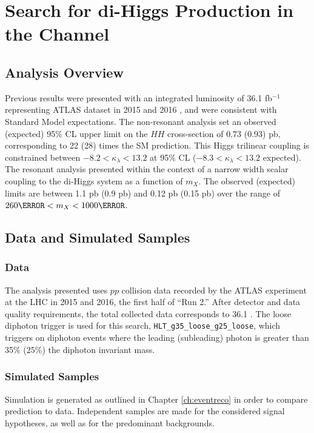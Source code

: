 \chapter{Search for di-Higgs Production in the Channel} %

\section{Analysis Overview}

Previous results were presented with an integrated luminosity of 36.1 fb$^{-1}$ representing ATLAS dataset in 2015 and 2016 \cite{HIGG-2016-15}, and were consistent with Standard Model expectations. The non-resonant analysis set an observed (expected) 95\% CL upper limit on the $HH$ cross-section of 0.73 (0.93) pb, corresponding to 22 (28) times the SM prediction. This Higgs trilinear coupling is constrained between $-8.2 < \kappa_\lambda < 13.2$ at 95\% CL ($-8.3 < \kappa_\lambda < 13.2$ expected). The resonant analysis presented within the context of a narrow width scalar coupling to the di-Higgs system as a function of $m_X$. The observed (expected) limits are between 1.1 pb (0.9 pb) and 0.12 pb (0.15 pb) over the range of $\unit{260}{\GeV} < m_X < \unit{1000}{\GeV}$.

\section{Data and Simulated Samples}


\subsection{Data}

The analysis presented uses $pp$ collision data recorded by the ATLAS experiment at the LHC in 2015 and 2016, the first half of ``Run 2.'' After detector and data quality requirements, the total collected data corresponds to 36.1 \ifb. The loose diphoton trigger is used for this search, \texttt{HLT\_g35\_loose\_g25\_loose}, which triggers on diphoton events where the leading (subleading) photon \pt is greater than 35\% (25\%) the diphoton invariant mass.

\subsection{Simulated Samples}

Simulation is generated as outlined in Chapter \ref{ch:eventreco} in order to compare prediction to data. Independent samples are made for the considered signal hypotheses, as well as for the predominant backgrounds.

